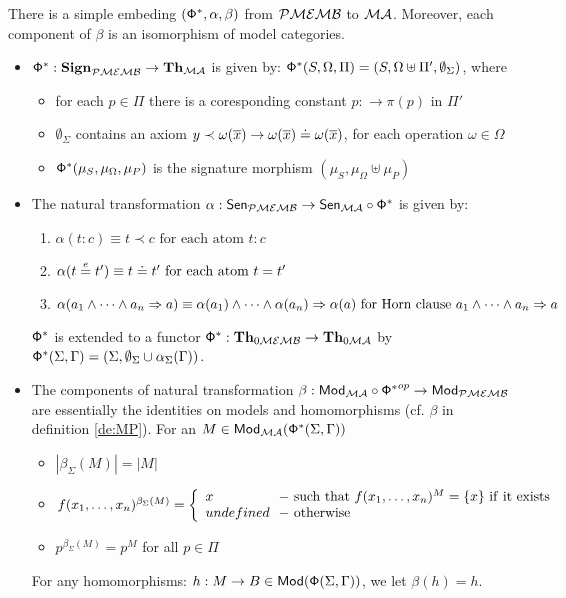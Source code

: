 \documentclass[10pt]{article}
\begin{document}
\begin{fact}  There is a simple embeding $({\sf {\Phi}}^*,\alpha,\beta)$ from 
${\mathcal{PMEMB}}$ to ${\mathcal{MA}}$. Moreover, each component of $\beta$ is an isomorphism of model
	categories. 
\begin{itemize} 
\item	${\sf {\Phi}}^*: {\bf Sign}_{{\mathcal{PMEMB}}} \to {\bf Th}_{{\mathcal{MA}}}$ is given
	by: ${\sf {\Phi}}^*(S,\Omega,\Pi)=(S,\Omega \uplus \Pi',
	\emptyset_{\Sigma})$, where
	\begin{itemize}
	\item for each $p \in \Pi$ there is a coresponding
	constant $p: \to \pi(p)$ in $\Pi'$ 
	\item $\emptyset_{\Sigma}$
	contains an axiom $y \prec \omega(\overline{x}) \to
	\omega(\overline{x}) \mathrel{\dot{=} } \omega(\overline{x})$, for each operation
	$\omega \in \Omega$
	\item ${\sf {\Phi}}^*(\mu_S,\mu_{\Omega},\mu_P)$ is the
	signature morphism $(\mu_S,\mu_{\Omega} \uplus \mu_P)$
	\end{itemize}
\item The natural transformation $\alpha: {\sf {Sen}}_{{\mathcal{PMEMB}}} \to 
{\sf {Sen}}_{{\mathcal{MA}}} \circ {\sf {\Phi}}^*$ is given by:
	\begin{enumerate}
	\item $\alpha(t:c) \equiv t \prec c\mbox{ for each atom }t:c$
	 \item $\alpha(t\stackrel{e}{=} t') \equiv t \mathrel{\dot{=} } t'\mbox{ for each atom }t = t'$
	 \item $\alpha(a_1 \wedge \cdots \wedge a_n \Rightarrow 
a) \equiv \alpha(a_1) \wedge \cdots \wedge \alpha(a_n) \Rightarrow 
\alpha(a)\mbox{ for  Horn clause }a_1 \wedge \cdots \wedge a_n \Rightarrow a$
	\end{enumerate}
${\sf {\Phi}}^*$ is extended to a functor 
${\sf {\Phi}}^*: {\bf Th}_{0{\mathcal{MEMB}}} \to {\bf Th}_{0{\mathcal{MA}}}$ by 
${\sf {\Phi}}^*(\Sigma,\Gamma) = (\Sigma,\emptyset_\Sigma\cup\alpha_\Sigma(\Gamma))$.

%		
\item The components of natural transformation $\beta: {\sf {Mod}}_{{\mathcal{MA}}} \circ
{{\sf {\Phi}}^*}^{op} \to {\sf {Mod}}_{{\mathcal{PMEMB}}}$ are essentially the identities on
models and homomorphisms (cf. $\beta$ in definition \ref{de:MP}).  For an $M \in
{\sf {Mod}}_{{\mathcal{MA}}}({\sf {\Phi}}^*(\Sigma,\Gamma))$
  \begin{itemize}
      \item $|\beta_\Sigma(M)| = |M|$
	\item $f(x_1, \ldots ,x_n)^{\beta_{\Sigma}(M)} = \left\{\begin{array}{l@{\ \
	-\ }l} x &
	{\rm such\ that\ } f(x_1, \ldots ,x_n)^{M}=\{x\}\ {\rm if\ it\
	exists}\\ undefined & {\rm otherwise} \end{array}\right.$
	\item $p^{\beta_{\Sigma}(M)} = p^{M}$ for all $p\in\Pi$
   \end{itemize}
For any homomorphisms:  $h: M \to B \in {\sf {Mod}}({\sf {\Phi}}(\Sigma,\Gamma))$, we let $\beta(h)=h$.
	\end{itemize}
\end{fact}
\end{document}
